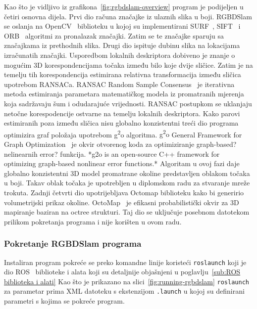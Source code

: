 Kao što je vidljivo iz grafikona~\ref{fig:rgbdslam-overview} program je
podijeljen u četiri osnovna dijela. Prvi dio računa značajke iz ulaznih
slika u boji. RGBDSlam se oslanja na OpenCV~\cite{opencv_library}
biblioteku u kojoj su implementirani SURF~\cite{Bay06surf:speeded},
SIFT~\cite{Lowe04distinctiveimage} i ORB~\cite{1302} algoritmi za
pronalazak značajki. Zatim se te značajke sparuju sa značajkama iz
prethodnih slika. Drugi dio ispituje dubinu slika na lokacijama
izračunatih značajki. Usporedbom lokalnih deskriptora dobiveno je znanje
o mogućim 3D korespondencijama točaka između bilo koje dvije sličice.
Zatim je na temelju tih korespondencija estimirana relativna
transformacija između sličica upotrebom RANSACa. RANSAC Random Sample
Consensus~\cite{AICPub836:1981} je iterativna metoda estimiranja
parametara matematičkog modela iz promatranih mjerenja koja sadržavaju
šum i odudarajuće vrijednosti. RANSAC postupkom se uklanjaju netočne
korespodencije ostvarne na temelju lokalnih deskriptora. Kako parovi
estimiranih poza između sličica nisu globalno konzistentni treći dio
programa optimizira graf položaja upotrebom g\textsuperscript{2}o
algoritma. {g\textsuperscript{2}o} General Framework for Graph
Optimization~\cite{kuemmerle11icra} je okvir otvorenog koda za
optimiziranje graph-based? nelinearnih error? funkcija. 
*g2o is an open-source C++ framework for optimizing graph-based nonlinear
error functions.*
Algoritam u ovoj
fazi daje globalno konzistentni 3D model promatrane okoline predstavljen
oblakom točaka u boji. Takav oblak točaka je upotrebljen u diplomskom
radu za stvaranje mreže trokuta. Zadnji četvrti dio upotrijebljava
Octomap biblioteku kako bi generirio volumetrijski prikaz okoline.
{OctoMap}~\cite{hornung13auro} je efikasni probabilistički okvir za 3D
mapiranje baziran na octree strukturi. Taj dio se uključuje posebnom
datotekom prilikom pokretanja programa i nije korišten u ovom radu.


\newpage
\subsubsection{Pokretanje RGBDSlam programa} %
\label{ssub:Pokretanje RGBDSlam programa}

Instaliran program pokreće se preko komandne linije koristeći
\texttt{roslaunch} koji je dio ROS~\cite{ros} biblioteke i alata
koji su detaljnije objašnjeni u poglavlju~\ref{sub:ROS biblioteka i
alati} Kao što je prikazano na slici~\ref{fig:running-rgbdslam}
\texttt{roslaunch} za parametar prima XML datoteku s ekstenzijom
\texttt{.launch} u kojoj su definirani parametri s kojima se pokreće
program.

